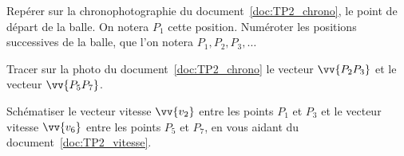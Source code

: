 
\vspace*{-4pt}

%

%



%
\mesure
Repérer sur la chronophotographie du document~\ref{doc:TP2_chrono}, le point de départ de la balle.
On notera $P_1$ cette position.
Numéroter les positions successives de la balle, que l'on notera $P_1, P_2, P_3, \ldots$

%
\mesure
Tracer sur la photo du document~\ref{doc:TP2_chrono} le vecteur $\vv{P_2 P_3}$ et le vecteur $\vv{P_5 P_7}$.

%

%
\mesure
Schématiser le vecteur vitesse $\vv{v_2}$ entre les points $P_1$ et $P_3$
et le vecteur vitesse $\vv{v_6}$ entre les points $P_5$ et $P_7$,
en vous aidant du document~\ref{doc:TP2_vitesse}.

%



% 
% 
% 
% 
% 
% 
